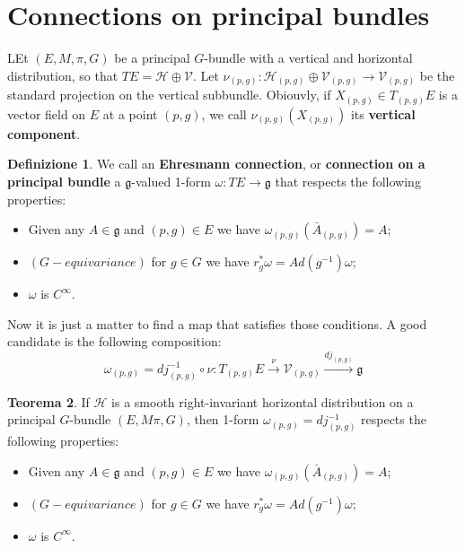 \documentclass[12pt,a4paper]{report}
\theoremstyle{definition}
\newtheorem{Def}{Definizione}[chapter]
\theoremstyle{Theorem}
\newtheorem{Theo}[Def]{Teorema}
\theoremstyle{definition}
\theoremstyle{definition}
\theoremstyle{definition}
\begin{document}
	\section{Connections on principal bundles}
		LEt $(E,M,\pi,G)$ be a principal $G$-bundle with a vertical and horizontal distribution, so that $TE=\mathcal{H}\oplus\mathcal{V}$. Let $\nu_{(p,g)}:\mathcal{H}_{(p,g)}\oplus\mathcal{V}_{(p,g)}\rightarrow \mathcal{V}_{(p,g)}$ be the standard projection on the vertical subbundle. Obiouvly, if $X_{(p,g)}\in T_{(p,g)}E$ is a vector field on $E$ at a point $(p,g)$, we call $\nu_{(p,g)}(X_{(p,g)})$ its \textbf{vertical component}.
		\begin{Def}\label{Def_6.6}
			We call an \textbf{Ehresmann connection}, or \textbf{connection on a principal bundle} a $\mathfrak{g}$-valued 1-form $\omega:TE\rightarrow \mathfrak{g}$ that respects the following properties:
			\begin{itemize}
				\item Given any $A\in\mathfrak{g}$ and $(p,g)\in E$ we have $\omega_{(p,g)}(\bar{A}_{(p,g)})=A$;
				\item $(G-equivariance)$ for $g\in G$ we have $r^*_g\omega=Ad(g^{-1})\omega$;
				\item $\omega$ is $C^\infty$.
			\end{itemize}
		\end{Def}
		Now it is just a matter to find a map that satisfies those conditions. A good candidate is the following composition:
		$$\omega_{(p,g)}=dj_{(p,g)}^{-1}\circ \nu:T_{(p,g)}E\xrightarrow{\nu} \mathcal{V}_{(p,g)}\xrightarrow{dj_{(p,g)}}\mathfrak{g}$$
		\begin{Theo}
			If $\mathcal{H}$ is a smooth right-invariant horizontal distribution on a principal $G$-bundle $(E,M\pi,G)$, then 1-form $\omega_{(p,g)}=dj_{(p,g)}^{-1}$ respects the following properties:
				\begin{itemize}
				\item Given any $A\in\mathfrak{g}$ and $(p,g)\in E$ we have $\omega_{(p,g)}(\bar{A}_{(p,g)})=A$;
				\item $(G-equivariance)$ for $g\in G$ we have $r^*_g\omega=Ad(g^{-1})\omega$;
				\item $\omega$ is $C^\infty$.
			\end{itemize}
		\end{Theo}
\end{document}
